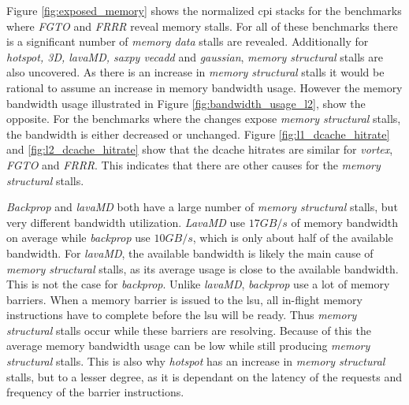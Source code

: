 Figure \ref{fig:exposed_memory} shows the normalized \acrshort{cpi} stacks for the benchmarks where \textit{FGTO} and \textit{FRRR} reveal memory stalls. For all of these benchmarks there is a significant number of \textit{memory data} stalls are revealed. Additionally for \textit{hotspot, 3D, lavaMD, saxpy vecadd} and \textit{gaussian}, \textit{memory structural} stalls are also uncovered. As there is an increase in \textit{memory structural} stalls it would be rational to assume an increase in memory bandwidth usage. However the memory bandwidth usage illustrated in Figure \ref{fig:bandwidth_usage_l2}, show the opposite. For the benchmarks where the changes expose \textit{memory structural} stalls, the bandwidth is either decreased or unchanged. Figure \ref{fig:l1_dcache_hitrate} and \ref{fig:l2_dcache_hitrate} show that the dcache hitrates are similar for \textit{\Gls{vortex}}, \textit{FGTO} and \textit{FRRR}. This indicates that there are other causes for the \textit{memory structural} stalls.

\textit{Backprop} and \textit{lavaMD} both have a large number of \textit{memory structural} stalls, but very different bandwidth utilization. \textit{LavaMD} use $17GB/s$ of memory bandwidth on average while \textit{backprop} use $10GB/s$, which is only about half of the available bandwidth. For \textit{lavaMD}, the available bandwidth is likely the main cause of \textit{memory structural} stalls, as its average usage is close to the available bandwidth. This is not the case for \textit{backprop}. Unlike \textit{lavaMD}, \textit{backprop} use a lot of memory barriers. When a memory barrier is issued to the \acrshort{lsu}, all in-flight memory instructions have to complete before the \acrshort{lsu} will be ready. Thus \textit{memory structural} stalls occur while these barriers are resolving. Because of this the average memory bandwidth usage can be low while still producing \textit{memory structural} stalls. This is also why \textit{hotspot} has an increase in \textit{memory structural} stalls, but to a lesser degree, as it is dependant on the latency of the requests and frequency of the barrier instructions.

